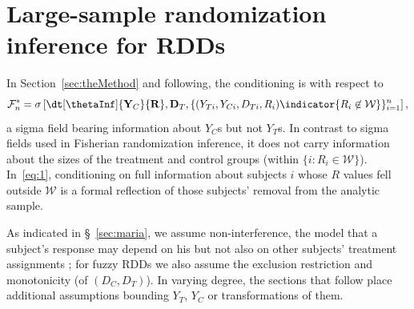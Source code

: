 \section{Large-sample randomization inference for RDDs} \label{sec:large-sample-rand}

In Section~\ref{sec:theMethod} and following, the conditioning is with respect to
\begin{equation} \label{eq:1}
\mathcal{F}^*_{n}=\sigma\left[ \dt[\thetaInf]{\mathbf{Y}_{C}}{
    \mathbf{R}},
\mathbf{D}_{T},  \{(Y_{Ti},
Y_{Ci}, D_{Ti}, R_{i})\indicator{{R}_{i} \not\in
  \mathcal{W}}\}_{i=1}^{n}\right],
\end{equation}
a sigma field bearing
information about $Y_C$s but not $Y_T$s. In contrast to sigma fields
used in Fisherian randomization inference, it does not carry
information about the sizes of the treatment and control groups
(within $\{i : R_{i} \in \mathcal{W}\}$).
In~\eqref{eq:1}, conditioning on full information about subjects $i$
whose $R$ values fell outside $\mathcal{W}$ is a formal reflection of
those subjects' removal from the analytic sample.

As indicated in \S~\ref{sec:maria},
we assume non-interference, the model that
a subject's response may depend on his but not also on other subjects'
treatment assignments \citep{cox:1958,rubin:1978}; for fuzzy RDDs we also
assume the exclusion restriction
and monotonicity (of $(D_{C}, D_{T})$).  In varying degree, the
sections that follow place additional assumptions bounding $Y_{T}$,
$Y_{C}$ or transformations of them.



